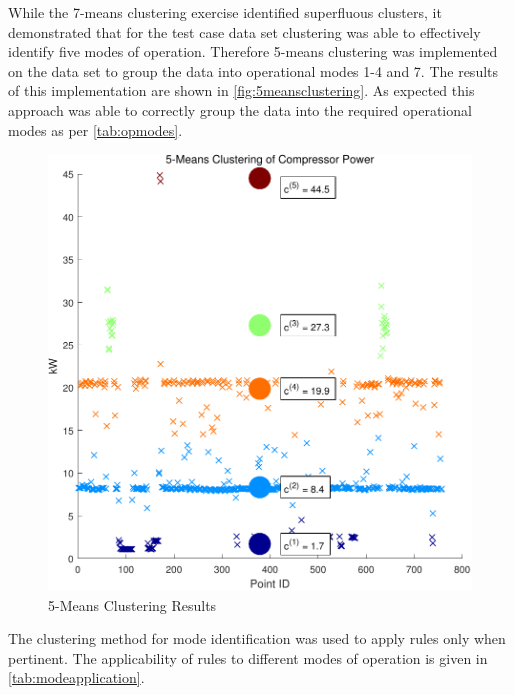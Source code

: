 While the 7-means clustering exercise identified superfluous clusters, it demonstrated that for the test case data set clustering was able to effectively identify five modes of operation. Therefore 5-means clustering was implemented on the data set to group the data into operational modes 1-4 and 7. The results of this implementation are shown in \autoref{fig:5meansclustering}. As expected this approach was able to correctly group the data into the required operational modes as per \autoref{tab:opmodes}.

\begin{figure}
\includegraphics[width = .5\columnwidth]{./Images/5MeansClustering.pdf}
\caption{5-Means Clustering Results}
\label{fig:5meansclustering}
\end{figure}

The clustering method for mode identification was used to apply rules only when pertinent. The applicability of rules to different modes of operation is given in \autoref{tab:modeapplication}.

